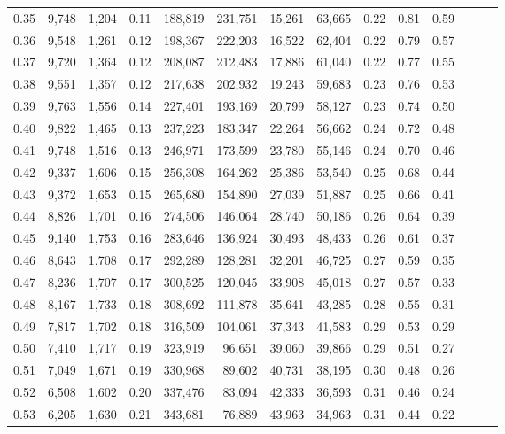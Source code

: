 \begin{tabular}{rrrrrrrrrrrrrr}
0.35 &  9,748 &  1,204 &  0.11 &  188,819 &  231,751 &  15,261 &  63,665 &  0.22 &  0.81 &      0.59 \\
0.36 &  9,548 &  1,261 &  0.12 &  198,367 &  222,203 &  16,522 &  62,404 &  0.22 &  0.79 &      0.57 \\
0.37 &  9,720 &  1,364 &  0.12 &  208,087 &  212,483 &  17,886 &  61,040 &  0.22 &  0.77 &      0.55 \\
0.38 &  9,551 &  1,357 &  0.12 &  217,638 &  202,932 &  19,243 &  59,683 &  0.23 &  0.76 &      0.53 \\
0.39 &  9,763 &  1,556 &  0.14 &  227,401 &  193,169 &  20,799 &  58,127 &  0.23 &  0.74 &      0.50 \\
0.40 &  9,822 &  1,465 &  0.13 &  237,223 &  183,347 &  22,264 &  56,662 &  0.24 &  0.72 &      0.48 \\
0.41 &  9,748 &  1,516 &  0.13 &  246,971 &  173,599 &  23,780 &  55,146 &  0.24 &  0.70 &      0.46 \\
0.42 &  9,337 &  1,606 &  0.15 &  256,308 &  164,262 &  25,386 &  53,540 &  0.25 &  0.68 &      0.44 \\
0.43 &  9,372 &  1,653 &  0.15 &  265,680 &  154,890 &  27,039 &  51,887 &  0.25 &  0.66 &      0.41 \\
0.44 &  8,826 &  1,701 &  0.16 &  274,506 &  146,064 &  28,740 &  50,186 &  0.26 &  0.64 &      0.39 \\
0.45 &  9,140 &  1,753 &  0.16 &  283,646 &  136,924 &  30,493 &  48,433 &  0.26 &  0.61 &      0.37 \\
0.46 &  8,643 &  1,708 &  0.17 &  292,289 &  128,281 &  32,201 &  46,725 &  0.27 &  0.59 &      0.35 \\
0.47 &  8,236 &  1,707 &  0.17 &  300,525 &  120,045 &  33,908 &  45,018 &  0.27 &  0.57 &      0.33 \\
0.48 &  8,167 &  1,733 &  0.18 &  308,692 &  111,878 &  35,641 &  43,285 &  0.28 &  0.55 &      0.31 \\
0.49 &  7,817 &  1,702 &  0.18 &  316,509 &  104,061 &  37,343 &  41,583 &  0.29 &  0.53 &      0.29 \\
0.50 &  7,410 &  1,717 &  0.19 &  323,919 &   96,651 &  39,060 &  39,866 &  0.29 &  0.51 &      0.27 \\
0.51 &  7,049 &  1,671 &  0.19 &  330,968 &   89,602 &  40,731 &  38,195 &  0.30 &  0.48 &      0.26 \\
0.52 &  6,508 &  1,602 &  0.20 &  337,476 &   83,094 &  42,333 &  36,593 &  0.31 &  0.46 &      0.24 \\
0.53 &  6,205 &  1,630 &  0.21 &  343,681 &   76,889 &  43,963 &  34,963 &  0.31 &  0.44 &      0.22 \\

\end{tabular}
